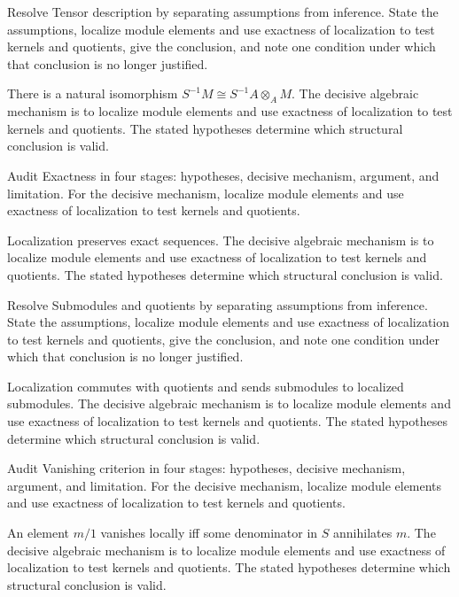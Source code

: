 \begin{problem}\label{prob:v07-problem-04}
Resolve Tensor description by separating assumptions from inference. State the assumptions, localize module elements and use exactness of localization to test kernels and quotients, give the conclusion, and note one condition under which that conclusion is no longer justified.
\end{problem}
\begin{solution}
There is a natural isomorphism $S^{-1}M\cong S^{-1}A\otimes_A M$. The decisive algebraic mechanism is to localize module elements and use exactness of localization to test kernels and quotients. The stated hypotheses determine which structural conclusion is valid.
\end{solution}

\begin{problem}\label{prob:v07-problem-05}
Audit Exactness in four stages: hypotheses, decisive mechanism, argument, and limitation. For the decisive mechanism, localize module elements and use exactness of localization to test kernels and quotients.
\end{problem}
\begin{solution}
Localization preserves exact sequences. The decisive algebraic mechanism is to localize module elements and use exactness of localization to test kernels and quotients. The stated hypotheses determine which structural conclusion is valid.
\end{solution}

\begin{problem}\label{prob:v07-problem-06}
Resolve Submodules and quotients by separating assumptions from inference. State the assumptions, localize module elements and use exactness of localization to test kernels and quotients, give the conclusion, and note one condition under which that conclusion is no longer justified.
\end{problem}
\begin{solution}
Localization commutes with quotients and sends submodules to localized submodules. The decisive algebraic mechanism is to localize module elements and use exactness of localization to test kernels and quotients. The stated hypotheses determine which structural conclusion is valid.
\end{solution}

\begin{problem}\label{prob:v07-problem-07}
Audit Vanishing criterion in four stages: hypotheses, decisive mechanism, argument, and limitation. For the decisive mechanism, localize module elements and use exactness of localization to test kernels and quotients.
\end{problem}
\begin{solution}
An element $m/1$ vanishes locally iff some denominator in $S$ annihilates $m$. The decisive algebraic mechanism is to localize module elements and use exactness of localization to test kernels and quotients. The stated hypotheses determine which structural conclusion is valid.
\end{solution}

